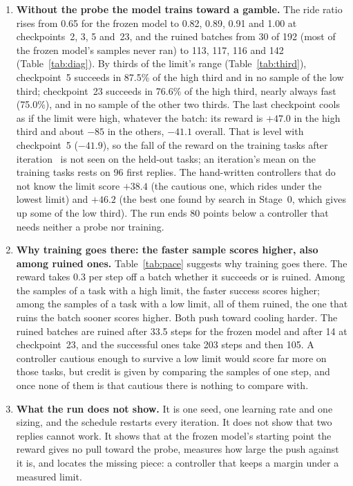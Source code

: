 \documentclass[11pt,a4paper]{article}
\begin{document}
\begin{enumerate}[leftmargin=*, itemsep=0.5em]
\item \textbf{Without the probe the model trains toward a gamble.} The
  ride ratio rises from 0.65 for the frozen model to 0.82, 0.89, 0.91 and
  1.00 at checkpoints~2, 3, 5 and~23, and the ruined batches from 30 of 192
  (most of the frozen model's samples never ran) to 113, 117, 116 and 142
  (Table~\ref{tab:diag}). By thirds of the limit's range
  (Table~\ref{tab:third}), checkpoint~5 succeeds in 87.5\% of the high third
  and in no sample of the low third; checkpoint~23 succeeds in 76.6\% of the
  high third, nearly always fast (75.0\%), and in no sample of the other two
  thirds. The last checkpoint cools as if the limit were high, whatever the
  batch: its reward is $+47.0$ in the high third and about $-85$ in the
  others, $-41.1$ overall. That is level with checkpoint~5 ($-41.9$), so the
  fall of the reward on the training tasks after
  iteration~\TRbestiteration{} is not seen on the held-out tasks; an
  iteration's mean on the training tasks rests on 96 first replies. The
  hand-written controllers that do not know the limit score $+38.4$ (the
  cautious one, which rides under the lowest limit) and $+46.2$ (the best one
  found by search in Stage~0, which gives up some of the low third). The run
  ends 80 points below a controller that needs neither a probe nor training.

\item \textbf{Why training goes there: the faster sample scores higher, also among
  ruined ones.}
  Table~\ref{tab:pace} suggests why training goes there. The reward takes
  0.3 per step off a batch whether it succeeds or is ruined. Among the
  samples of a task with a high limit, the faster success scores higher;
  among the samples of a task with a low limit, all of them ruined, the one
  that ruins the batch sooner scores higher. Both push toward cooling harder.
  The ruined batches are ruined after 33.5 steps for the frozen model and
  after 14 at checkpoint~23, and the successful ones take 203 steps and then
  105. A controller cautious enough to survive a low limit would score far
  more on those tasks, but credit is given by comparing the samples of one
  step, and once none of them is that cautious there is nothing to compare
  with.

\item \textbf{What the run does not show.} It is one seed, one learning
  rate and one sizing, and the schedule restarts every iteration. It does not
  show that two replies cannot work. It shows that at the frozen model's
  starting point the reward gives no pull toward the probe, measures how
  large the push against it is, and locates the missing piece: a controller
  that keeps a margin under a measured limit.
\end{enumerate}
\end{document}
